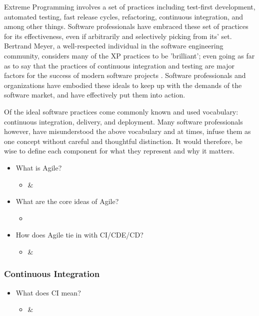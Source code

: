 \documentclass[11pt,a4paper]{article}
\begin{document}
Extreme Programming involves a set of practices including test-first development, automated testing, fast release cycles, refactoring, continuous integration, and among other things. Software professionals have embraced these set of practices for its effectiveness, even if arbitrarily and selectively picking from its' set. Bertrand Meyer, a well-respected individual in the software engineering community, considers many of the XP practices to be 'brilliant'; even going as far as to say that the practices of continuous integration and testing are major factors for the success of modern software projects \cite[p. ~154]{meyer_2014}. Software professionals and organizations have embodied these ideals to keep up with the demands of the software market, and have effectively put them into action.

Of the ideal software practices come commonly known and used vocabulary: continuous integration, delivery, and deployment. Many software professionals however, have misunderstood the above vocabulary and at times, infuse them as one concept without careful and thoughtful distinction. It would therefore, be wise to define each component for what they represent and why it matters.

		\begin{itemize}[noitemsep]
			\item What is Agile?
			\begin{itemize}
				\item \cite{bosch_2014} \& \cite{meyer_2014}
			\end{itemize}
			\item What are the core ideas of Agile?
			\begin{itemize}
				\item \cite{meyer_2014}
			\end{itemize}
			\item How does Agile tie in with CI/CDE/CD?
			\begin{itemize}
				\item \cite{shahin_babar_zhu_2017} \& \cite{stackify_2018}
			\end{itemize}
		\end{itemize}
		\vspace{-7mm}
		\subsubsection{Continuous Integration}
		\begin{itemize}[noitemsep]
			\item What does CI mean?
			\begin{itemize}
				\item \cite{shahin_babar_zhu_2017} \& \cite{stackify_2018}
			\end{itemize}
		\end{itemize}
\end{document}
